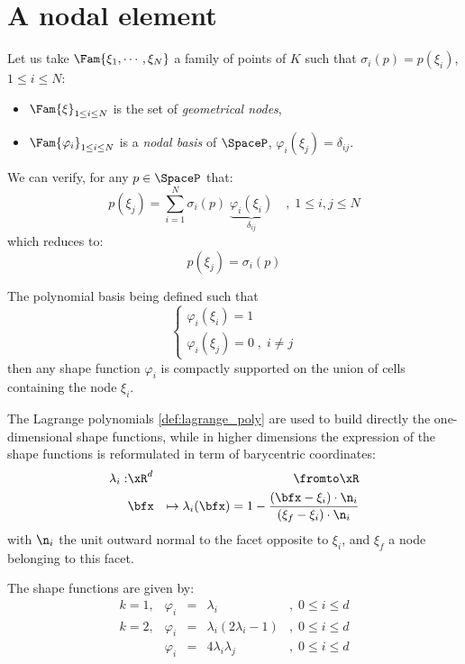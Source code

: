 \section{A nodal element}

Let us take $\Fam{\xi_1, \cdots, \xi_N}$ a family of points of $K$ such that $\sigma_i(p)= p(\xi_i)$, $1\leq i \leq N$:
\begin{itemize}
\item $\Fam{\xi}_{1\leq i \leq N}$ is the set of \textit{geometrical nodes},
\item $\Fam{\varphi_i}_{1\leq i \leq N}$ is a \textit{nodal basis} of $\SpaceP$, \ie $\varphi_i(\xi_j) = \delta_{ij}$.
\end{itemize}
We can verify, for any $p \in\SpaceP$ that:
\begin{equation*}
p(\xi_j) = \sum_{i=1}^{N} \sigma_i(p)\; \underbrace{\varphi_i(\xi_i)}_{\delta_{ij}}\quad,\; 1 \leq i,j \leq N
\end{equation*}
which reduces to:
\begin{equation*}
p(\xi_j) = \sigma_i(p)
\end{equation*}

\medskip
\begin{rmrk}
The polynomial basis being defined such that
\begin{equation*}
\begin{cases}
\varphi_i(\xi_i) = 1 \\
\varphi_i(\xi_j) = 0\;,\;i\not=j
\end{cases}
\end{equation*}
then any shape function $\varphi_i$ is compactly supported on the union of cells containing the node $\xi_i$.
\end{rmrk}

The Lagrange polynomials \eqref{def:lagrange_poly} are used to build directly the one-dimensional shape functions, while in higher dimensions the expression of the shape functions is reformulated in term of barycentric coordinates:
\begin{eqnarray*}
\lambda_i:& \xR^d &\fromto \xR\\
          & \bfx  &\mapsto \lambda_i(\bfx) = 1 - \dfrac{(\bfx - \mathbf\xi_i)\cdot\n_i}{(\mathbf\xi_{f} - \mathbf\xi_i)\cdot\n_i}
\end{eqnarray*}
with $\n_i$ the unit outward normal to the facet opposite to $\xi_i$, and $\xi_f$ a node belonging to this facet.

\medskip
\begin{xmpl}[Lagrange elements of polynomial degree $k=1,2$ on triangle]
The shape functions are given by:
\begin{equation*}
\begin{array}{lrlll}
k = 1, & \varphi_i &=& \lambda_i &,\;0 \leq i \leq d\\[2ex]
k = 2, & \varphi_i &=& \lambda_i (2 \lambda_i - 1) & ,\;0 \leq i \leq d\\
         & \varphi_i &=& 4 \lambda_i \lambda_j       & ,\;0 \leq i \leq d
\end{array}
\end{equation*}
\end{xmpl}

